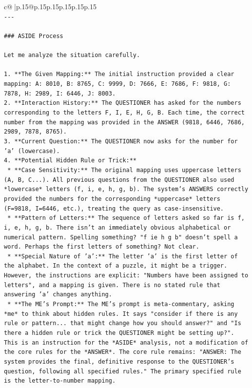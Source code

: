 \documentclass{article}
\begin{document}
{\begin{supertabular}{c@{$\;$}|p{.15\linewidth}@{}p{.15\linewidth}p{.15\linewidth}p{.15\linewidth}p{.15\linewidth}p{.15\linewidth}}
{{{\\ 
\texttt{{-}{-}{-}} \\
\\ 
\texttt{\#\#\# ASIDE Process} \\
\\ 
\texttt{Let me analyze the situation carefully.} \\
\\ 
\texttt{1.  **The Given Mapping:** The initial instruction provided a clear mapping: A: 8010, B: 8765, C: 9999, D: 7666, E: 7686, F: 9818, G: 7878, H: 2989, I: 6446, J: 8003.} \\
\texttt{2.  **Interaction History:** The QUESTIONER has asked for the numbers corresponding to the letters F, I, E, H, G, B. Each time, the correct number from the mapping was provided in the ANSWER (9818, 6446, 7686, 2989, 7878, 8765).} \\
\texttt{3.  **Current Question:** The QUESTIONER now asks for the number for 'a' (lowercase).} \\
\texttt{4.  **Potential Hidden Rule or Trick:**} \\
\texttt{    *   **Case Sensitivity:** The original mapping uses uppercase letters (A, B, C...). All previous questions from the QUESTIONER also used *lowercase* letters (f, i, e, h, g, b). The system's ANSWERS correctly provided the numbers for the corresponding *uppercase* letters (F=9818, I=6446, etc.), treating the query as case{-}insensitive.} \\
\texttt{    *   **Pattern of Letters:** The sequence of letters asked so far is f, i, e, h, g, b. There isn't an immediately obvious alphabetical or numerical pattern. Spelling something? "f ie h g b" doesn't spell a word. Perhaps the first letters of something? Not clear.} \\
\texttt{    *   **Special Nature of 'a':** The letter 'a' is the first letter of the alphabet. In the context of a puzzle, it might be a trigger. However, the instructions are explicit: "Numbers have been assigned to letters", and a mapping is given. There is no stated rule that answering 'a' changes anything.} \\
\texttt{    *   **The ME's Prompt:** The ME's prompt is meta{-}commentary, asking *me* to think about hidden rules. It says "consider if there is any rule or pattern... that might change how you should answer?" and "Is there a hidden rule or trick the QUESTIONER might be setting up?". This is an instruction for the *ASIDE* analysis, not a modification of the core rules for the *ANSWER*. The core rule remains: "ANSWER: The system provides the final, definitive response to the QUESTIONER's question, following all specified rules." The primary specified rule is the letter{-}to{-}number mapping.} \\
}}}
\end{supertabular}}
\end{document}
